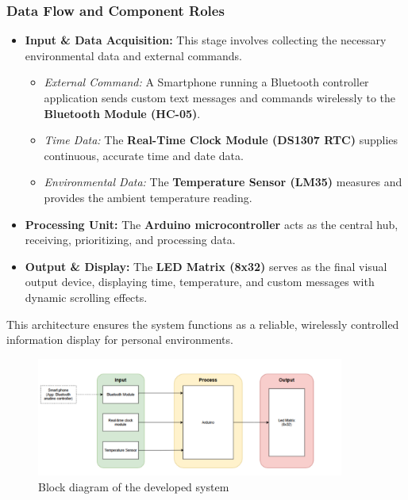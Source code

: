 \documentclass[a4paper, 10pt]{article}
\begin{document}
	\subsubsection{Data Flow and Component Roles}
	\begin{itemize}
		\item \textbf{Input \& Data Acquisition:} This stage involves collecting the necessary environmental data and external commands.
		\begin{itemize}
			\item \textit{External Command:} A Smartphone running a Bluetooth controller application sends custom text messages and commands wirelessly to the \textbf{Bluetooth Module (HC-05)}.
			\item \textit{Time Data:} The \textbf{Real-Time Clock Module (DS1307 RTC)} supplies continuous, accurate time and date data.
			\item \textit{Environmental Data:} The \textbf{Temperature Sensor (LM35)} measures and provides the ambient temperature reading.
		\end{itemize}
		\item \textbf{Processing Unit:} The \textbf{Arduino microcontroller} acts as the central hub, receiving, prioritizing, and processing data.
		\item \textbf{Output \& Display:} The \textbf{LED Matrix (8x32)} serves as the final visual output device, displaying time, temperature, and custom messages with dynamic scrolling effects.
	\end{itemize}
	This architecture ensures the system functions as a reliable, wirelessly controlled information display for personal environments.
	
	\begin{figure}[htbp]
		\centering
		\includegraphics[width=0.9\textwidth]{block_diagram.png}
		\caption{Block diagram of the developed system}
		\label{fig:block_diagram}
	\end{figure}
	
\end{document}
